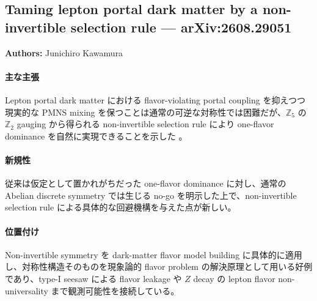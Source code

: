 \subsection{Taming lepton portal dark matter by a non-invertible selection rule --- arXiv:2608.29051}

\textbf{Authors:} Junichiro Kawamura

\paragraph{主な主張}
Lepton portal dark matter における flavor-violating portal coupling を抑えつつ現実的な PMNS mixing を保つことは通常の可逆な対称性では困難だが、$\mathbb{Z}_5$ の $\mathbb{Z}_2$ gauging から得られる non-invertible selection rule により one-flavor dominance を自然に実現できることを示した \cite{Kawamura:2026leptonportal}。

\paragraph{新規性}
従来は仮定として置かれがちだった one-flavor dominance に対し、通常の Abelian discrete symmetry では生じる no-go を明示した上で、non-invertible selection rule による具体的な回避機構を与えた点が新しい。

\paragraph{位置付け}
Non-invertible symmetry を dark-matter flavor model building に具体的に適用し、対称性構造そのものを現象論的 flavor problem の解決原理として用いる好例であり、type-I seesaw による flavor leakage や $Z$ decay の lepton flavor non-universality まで観測可能性を接続している。
